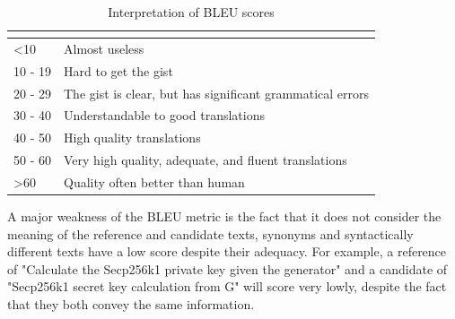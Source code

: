 \label{tab:BLEUScale}
\begin{table}[H]
\begin{tabular}{l|l}
\hline
\rowcolor[HTML]{E8EAED} 
\multicolumn{1}{|l|}{\cellcolor[HTML]{E8EAED}{\color[HTML]{202124} \textbf{BLEU Score}}} & \multicolumn{1}{l|}{\cellcolor[HTML]{E8EAED}{\color[HTML]{202124} Interpretation}} \\ \hline
\rowcolor[HTML]{FFFFFF} 
{\color[HTML]{202124} \textless 10}                                                      & {\color[HTML]{202124} Almost useless}                                              \\
\rowcolor[HTML]{FFFFFF} 
{\color[HTML]{202124} 10 - 19}                                                           & {\color[HTML]{202124} Hard to get the gist}                                        \\
\rowcolor[HTML]{FFFFFF} 
{\color[HTML]{202124} 20 - 29}                                                           & {\color[HTML]{202124} The gist is clear, but has significant grammatical errors}   \\
\rowcolor[HTML]{FFFFFF} 
{\color[HTML]{202124} 30 - 40}                                                           & {\color[HTML]{202124} Understandable to good translations}                         \\
\rowcolor[HTML]{FFFFFF} 
{\color[HTML]{202124} 40 - 50}                                                           & {\color[HTML]{202124} High quality translations}                                   \\
\rowcolor[HTML]{FFFFFF} 
{\color[HTML]{202124} 50 - 60}                                                           & {\color[HTML]{202124} Very high quality, adequate, and fluent translations}        \\
\rowcolor[HTML]{FFFFFF} 
{\color[HTML]{202124} \textgreater 60}                                                   & {\color[HTML]{202124} Quality often better than human}
\end{tabular}
\caption{Interpretation of BLEU scores \cite{evaluationSummarization}}
\end{table}

A major weakness of the BLEU metric is the fact that it does not consider the meaning of the reference and candidate texts, synonyms and syntactically different texts have a low score despite their adequacy. For example, a reference of "Calculate the Secp256k1 private key given the generator" and a candidate of "Secp256k1 secret key calculation from G" will score very lowly, despite the fact that they both convey the same information. 